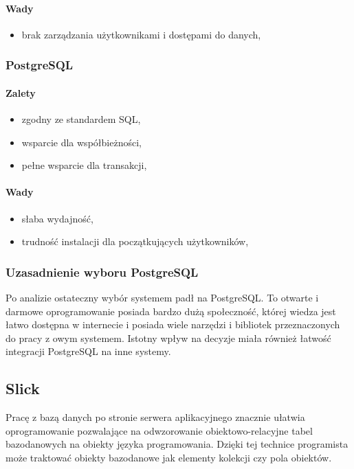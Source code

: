 \documentclass[a4paper,12pt,twoside]{article}
\begin{document}
\paragraph{Wady}
\begin{itemize}
\item{brak zarządzania użytkownikami i dostępami do danych},
\end{itemize}

\subsubsection{PostgreSQL}
\paragraph{Zalety}
\begin{itemize}
\item{zgodny ze standardem SQL},
\item{wsparcie dla współbieżności},
\item{pełne wsparcie dla transakcji},
\end{itemize}
\paragraph{Wady}
\begin{itemize}
\item{słaba wydajność},
\item{trudność instalacji dla początkujących użytkowników},
\end{itemize}

\subsubsection{Uzasadnienie wyboru PostgreSQL}
Po analizie ostateczny wybór systemem padł na PostgreSQL.
To otwarte i darmowe oprogramowanie posiada bardzo dużą społeczność, której wiedza jest łatwo dostępna w internecie
i posiada wiele narzędzi i bibliotek przeznaczonych do pracy z owym systemem.
Istotny wpływ na decyzje miała również łatwość integracji PostgreSQL na inne systemy.

\subsection{Slick}
Pracę z bazą danych po stronie serwera aplikacyjnego
znacznie ułatwia oprogramowanie pozwalające na odwzorowanie obiektowo-relacyjne tabel bazodanowych na obiekty języka programowania.
Dzięki tej technice programista może traktować obiekty bazodanowe jak elementy kolekcji czy pola obiektów.
\end{document}
